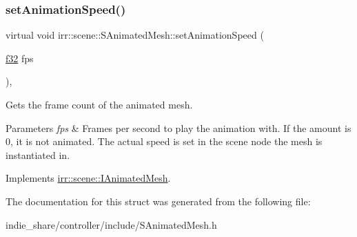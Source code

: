\mbox{\label{structirr_1_1scene_1_1SAnimatedMesh_ae7a32638fe5c59007d044bbc3c170108}} 
\subsubsection{\texorpdfstring{set\+Animation\+Speed()}{setAnimationSpeed()}\hspace{0.1cm}{\footnotesize\ttfamily [2/2]}}
{\footnotesize\ttfamily virtual void irr\+::scene\+::\+S\+Animated\+Mesh\+::set\+Animation\+Speed (\begin{DoxyParamCaption}\item[{\hyperlink{namespaceirr_a0277be98d67dc26ff93b1a6a1d086b07}{f32}}]{fps }\end{DoxyParamCaption})\hspace{0.3cm}{\ttfamily [inline]}, {\ttfamily [virtual]}}



Gets the frame count of the animated mesh. 


\begin{DoxyParams}{Parameters}
{\em fps} & Frames per second to play the animation with. If the amount is 0, it is not animated. The actual speed is set in the scene node the mesh is instantiated in. \\
\hline
\end{DoxyParams}


Implements \hyperlink{classirr_1_1scene_1_1IAnimatedMesh_a5eb1b09d96547dbd273d489e58d62658}{irr\+::scene\+::\+I\+Animated\+Mesh}.



The documentation for this struct was generated from the following file\+:\begin{DoxyCompactItemize}
\item 
indie\+\_\+share/controller/include/S\+Animated\+Mesh.\+h\end{DoxyCompactItemize}
